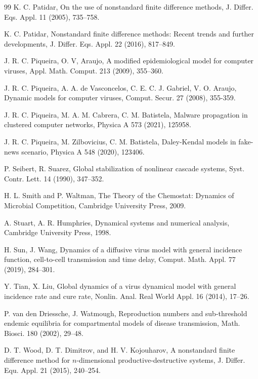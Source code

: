 \documentclass[11pt]{article}
\theoremstyle{definition}
\theoremstyle{remark}
\numberwithin{equation}{section}
\begin{document}
\begin{thebibliography}{99}
K. C. Patidar, 
On the use of nonstandard finite difference methods,
J. Differ. Eqs. Appl. 11 (2005), 735--758.

K. C. Patidar, 
Nonstandard finite difference methods: Recent trends and further developments, 
J. Differ. Eqs. Appl. 22 (2016), 817--849.

J. R. C. Piqueira, O. V, Araujo, A modified epidemiological model for computer viruses,
Appl. Math. Comput. 213 (2009), 355--360.

J. R. C. Piqueira, A. A. de Vasconcelos, C. E. C. J. Gabriel, V. O. Araujo, Dynamic models for computer viruses,
Comput. Secur. 27 (2008), 355-359.

 J. R. C. Piqueira, M. A. M. Cabrera, C. M. Batistela, 
 Malware propagation in clustered computer networks, 
 Physica A 573 (2021), 125958.
 
J. R. C. Piqueira, M. Zilbovicius, C. M. Batistela, 
Daley-Kendal models in fake-news scenario, 
Physica A 548 (2020), 123406.

P. Seibert, R. Suarez, 
Global stabilization of nonlinear cascade systems, 
Syst. Contr. Lett. 14 (1990), 347--352.

H. L. Smith and P. Waltman,  
The Theory of the Chemostat: Dynamics of Microbial Competition,
Cambridge University Press, 2009.

A. Stuart, A. R. Humphries, 
Dynamical systems and numerical analysis,
Cambridge University Press, 1998.

H. Sun, J. Wang, 
Dynamics of a diffusive virus model with general incidence function, cell-to-cell transmission and time delay, 
Comput. Math. Appl. 77 (2019), 284--301.

Y. Tian, X. Liu,
Global dynamics of a virus dynamical model with general incidence rate and cure rate, 
Nonlin. Anal. Real World Appl. 16 (2014), 17--26.

P. van den Driessche, J. Watmough, 
Reproduction numbers and sub-threshold endemic equilibria for compartmental models of disease transmission, 
Math. Biosci. 180 (2002), 29--48.

D. T. Wood, D. T. Dimitrov, and H. V. Kojouharov, 
A nonstandard finite difference method for $n$-dimensional productive-destructive systems, 
J. Differ. Equ. Appl. 21 (2015), 240--254.


\end{thebibliography}
\end{document}

